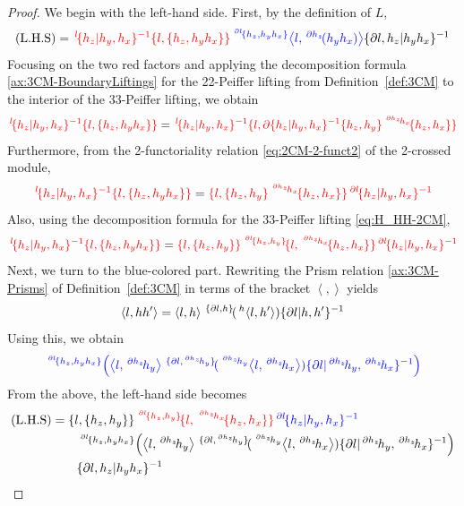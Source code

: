 \documentclass[11pt, reqno]{amsart} %
\newcommand{\act}[1]{\,\sp{#1}\!}
\newcommand{\red}[1]{\textcolor{red}{#1}}
\newcommand{\blue}[1]{\textcolor{blue}{#1}}
\theoremstyle{definition}
\theoremstyle{remark}
\numberwithin{equation}{section}
\begin{document}
\begin{proof}
We begin with the left-hand side. First, by the definition of $L$,
\[
  \text{(L.H.S)} = \red{\act{l}\{h_z|h_y,h_x\}^{-1}\{l,\{h_z,h_yh_x\}\}}\blue{\act{\act{\partial l}\{h_z,h_yh_x\}}\left<l,\act{\partial h_z}(h_yh_x)\right>}\{\partial l,h_z|h_yh_x\}^{-1}
\]
Focusing on the two red factors and applying the decomposition formula \ref{ax:3CM-BoundaryLiftings} for the 22-Peiffer lifting from Definition~\ref{def:3CM} to the interior of the 33-Peiffer lifting, we obtain
\[
  \red{\act{l}\{h_z|h_y,h_x\}^{-1}\{l,\{h_z,h_yh_x\}\}} = \red{\act{l}\{h_z|h_y,h_x\}^{-1}\{l,\partial\{h_z|h_y,h_x\}^{-1}\{h_z,h_y\}\act{\act{\partial h_z}h_x}\{h_z,h_x\}\}}
\]
Furthermore, from the 2-functoriality relation \eqref{eq:2CM-2-funct2} of the 2-crossed module,
\[
  \red{\act{l}\{h_z|h_y,h_x\}^{-1}\{l,\{h_z,h_yh_x\}\}} = \red{\{l,\{h_z,h_y\}\act{\act{\partial h_z}h_x}\{h_z,h_x\}\}\act{\partial l}\{h_z|h_y,h_x\}^{-1}}
\]
Also, using the decomposition formula for the 33-Peiffer lifting \eqref{eq:H_HH-2CM},
\[
  \red{\act{l}\{h_z|h_y,h_x\}^{-1}\{l,\{h_z,h_yh_x\}\}} = \red{\{l,\{h_z,h_y\}\}\act{\act{\partial l}\{h_z,h_y\}}\{l,\act{\act{\partial h_z}h_x}\{h_z,h_x\}\}\act{\partial l}\{h_z|h_y,h_x\}^{-1}}
\]
Next, we turn to the blue-colored part. Rewriting the Prism relation \ref{ax:3CM-Prisms} of Definition~\ref{def:3CM} in terms of the bracket $\left<,\right>$ yields
\begin{equation}
  \label{eq:braket322}
  \left<l,hh'\right> = \left<l,h\right>\act{\{\partial l,h\}}(\act{h}\left<l,h'\right>)\{\partial l|h,h'\}^{-1}
\end{equation}
Using this, we obtain
\[
  \blue{\act{\act{\partial l}\{h_z,h_yh_x\}}\left(\left<l,\act{\partial h_z}h_y\right>\act{\{\partial l,\act{\partial h_z}h_y\}}(\act{\act{\partial h_z}h_y}\left<l,\act{\partial h_z}h_x\right>)\{\partial l|\act{\partial h_z}h_y,\act{\partial h_z}h_x\}^{-1}\right)}
\]
From the above, the left-hand side becomes
\begin{align*}
  \text{(L.H.S)} &= 
  \{l,\{h_z,h_y\}\}\red{\act{\act{\partial l}\{h_z,h_y\}}\{l,\act{\act{\partial h_z}h_x}\{h_z,h_x\}\}}\blue{\act{\partial l}\{h_z|h_y,h_x\}^{-1}} \\
  &\qquad \act{\act{\partial l}\{h_z,h_yh_x\}}\left(\left<l,\act{\partial h_z}h_y\right>\act{\{\partial l,\act{\partial h_z}h_y\}}(\act{\act{\partial h_z}h_y}\left<l,\act{\partial h_z}h_x\right>)\{\partial l|\act{\partial h_z}h_y,\act{\partial h_z}h_x\}^{-1}\right) \\
  &\qquad \{\partial l,h_z|h_yh_x\}^{-1} \\

\end{align*}
\end{proof}
\end{document}
